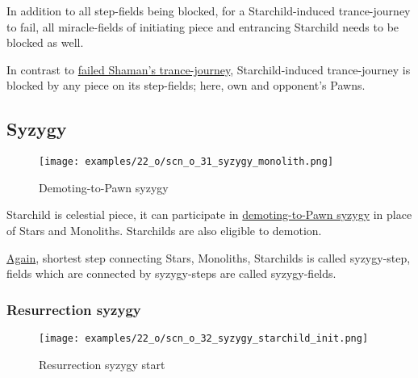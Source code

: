 In addition to all step-fields being blocked, for a Starchild-induced trance-journey
to fail, all miracle-fields of initiating piece and entrancing Starchild needs
to be blocked as well.

In contrast to
\hyperref[fig:scn_o_29_trance_journey_failed]{failed Shaman's trance-journey},
Starchild-induced trance-journey is blocked by any piece on its step-fields;
here, own and opponent's Pawns.

\clearpage %

\subsection*{Syzygy}
\label{sec:One/Starchild/Syzygy}

\vspace*{-1.4\baselineskip}
\noindent
\begin{figure}[!h]
\texttt{[image: examples/22\_o/scn\_o\_31\_syzygy\_monolith.png]}
\caption{Demoting-to-Pawn syzygy}
\label{fig:scn_o_31_syzygy_monolith}
\end{figure}

Starchild is celestial piece, it can participate in
\hyperref[fig:scn_d_19_syzygy_2_stars_init]{demoting-to-Pawn syzygy} in place of
Stars and Monoliths. Starchilds are also eligible to demotion.

\hyperref[fig:scn_d_18_syzygy_explain]{Again}, shortest step connecting
Stars, Monoliths, Starchilds is called syzygy-step, fields which are connected by
syzygy-steps are called syzygy-fields.

\clearpage %

\subsubsection*{Resurrection syzygy}
\label{sec:One/Starchild/Syzygy/Resurrection syzygy}

\vspace*{-1.4\baselineskip}
\noindent
\begin{figure}[!h]
\texttt{[image: examples/22\_o/scn\_o\_32\_syzygy\_starchild\_init.png]}
\caption{Resurrection syzygy start}
\label{fig:scn_o_32_syzygy_starchild_init}
\end{figure}

